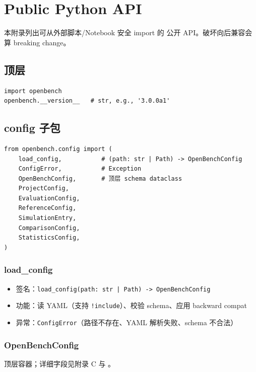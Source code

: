 
\chapter{Public Python API}

本附录列出可从外部脚本/Notebook 安全 import 的 \openbench{} 公开 API。破坏向后兼容会算 breaking change。

\section{顶层}

\begin{verbatim}
import openbench
openbench.__version__   # str, e.g., '3.0.0a1'
\end{verbatim}

\section{config 子包}

\begin{verbatim}
from openbench.config import (
    load_config,           # (path: str | Path) -> OpenBenchConfig
    ConfigError,           # Exception
    OpenBenchConfig,       # 顶层 schema dataclass
    ProjectConfig,
    EvaluationConfig,
    ReferenceConfig,
    SimulationEntry,
    ComparisonConfig,
    StatisticsConfig,
)
\end{verbatim}

\subsection{load\_config}

\begin{itemize}
  \item 签名：\texttt{load\_config(path: str | Path) -> OpenBenchConfig}
  \item 功能：读 YAML（支持 \texttt{!include}）、校验 schema、应用 backward compat
  \item 异常：\texttt{ConfigError}（路径不存在、YAML 解析失败、schema 不合法）
\end{itemize}

\subsection{OpenBenchConfig}

顶层容器；详细字段见附录 C 与 。

